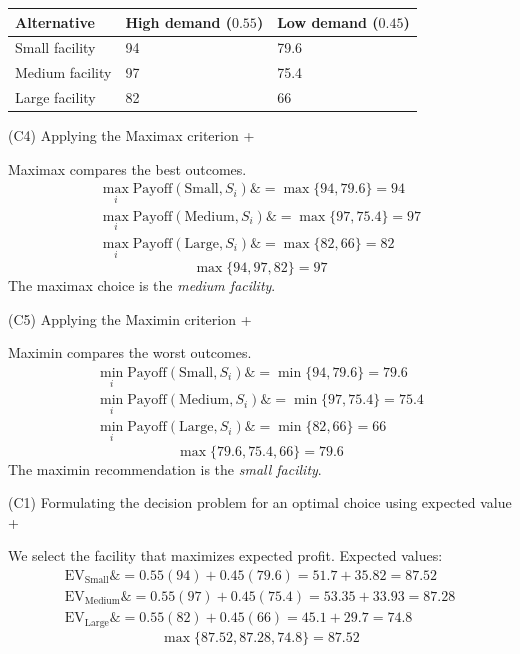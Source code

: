 \documentclass[11pt]{article}
\begin{document}
	\begin{center}
		\begin{tabular}{lll}
			\toprule
			Alternative & High demand
			($0.55$) & Low demand
			($0.45$) \\
			\midrule
			Small facility & 94 & 79.6 \\
			Medium facility & 97 & 75.4 \\
			Large facility & 82 & 66 \\
			\bottomrule
		\end{tabular}
	\end{center}
	
	
	
	
	
	
	(C4) Applying the Maximax criterion
	+
	
	
	Maximax compares the best outcomes.
	\[
	\begin{aligned}
		\max_i \text{Payoff}(\text{Small}, S_i) \&= \max\{94, 79.6\} = 94 \\
		\max_i \text{Payoff}(\text{Medium}, S_i) \&= \max\{97, 75.4\} = 97 \\
		\max_i \text{Payoff}(\text{Large}, S_i) \&= \max\{82, 66\} = 82
	\end{aligned}
	\]
	\[
	\max\{94, 97, 82\} = 97
	\]
	The maximax choice is the \emph{medium facility}.
	
	
	
	
	
	(C5) Applying the Maximin criterion
	+
	
	
	Maximin compares the worst outcomes.
	\[
	\begin{aligned}
		\min_i \text{Payoff}(\text{Small}, S_i) \&= \min\{94, 79.6\} = 79.6 \\
		\min_i \text{Payoff}(\text{Medium}, S_i) \&= \min\{97, 75.4\} = 75.4 \\
		\min_i \text{Payoff}(\text{Large}, S_i) \&= \min\{82, 66\} = 66
	\end{aligned}
	\]
	\[
	\max\{79.6, 75.4, 66\} = 79.6
	\]
	The maximin recommendation is the \emph{small facility}.
	
	
	
	
	
	(C1) Formulating the decision problem for an optimal choice using expected value
	+
	
	
	We select the facility that maximizes expected profit. Expected values:
	\[
	\begin{aligned}
		\mathrm{EV}_{\text{Small}} \&= 0.55(94) + 0.45(79.6) = 51.7 + 35.82 = 87.52 \\
		\mathrm{EV}_{\text{Medium}} \&= 0.55(97) + 0.45(75.4) = 53.35 + 33.93 = 87.28 \\
		\mathrm{EV}_{\text{Large}} \&= 0.55(82) + 0.45(66) = 45.1 + 29.7 = 74.8
	\end{aligned}
	\]
	\[
	\max\{87.52, 87.28, 74.8\} = 87.52
	\]
	
\end{document}
